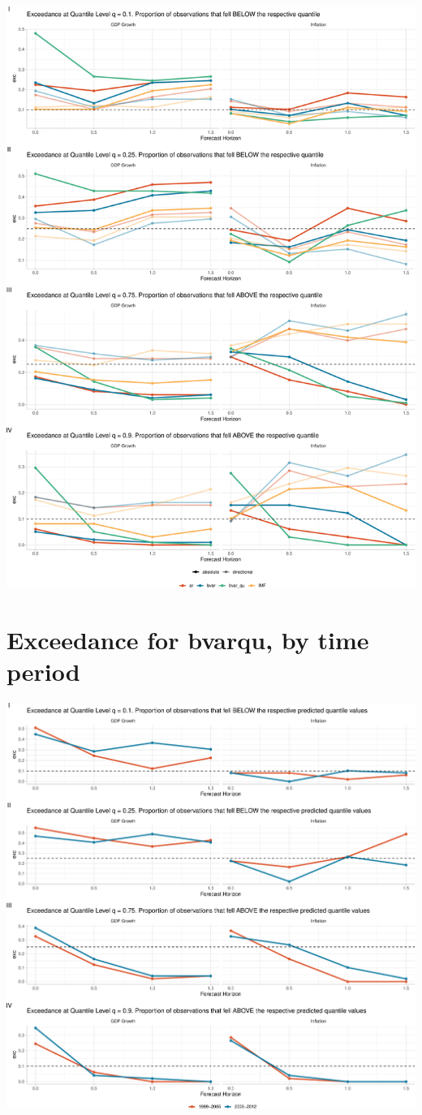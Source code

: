 \documentclass[
]{article}
\begin{document}
\includegraphics{quantile_coverage_files/figure-latex/unnamed-chunk-4-1.pdf}

\hypertarget{exceedance-for-bvarqu-by-time-period}{%
\section{Exceedance for bvarqu, by time period}\label{exceedance-for-bvarqu-by-time-period}}

\includegraphics{quantile_coverage_files/figure-latex/unnamed-chunk-5-1.pdf}
\end{document}
